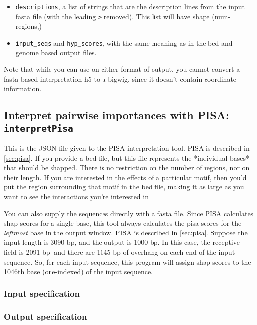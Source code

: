 \documentclass{article}
\begin{document}
\begin{itemize}
    \item \texttt{descriptions}, a list of strings that are the description
        lines from the input fasta file (with the leading \texttt{>} removed).
        This list will have shape (num-regions,)
    \item \texttt{input\_seqs} and \texttt{hyp\_scores}, with the same meaning
        as in the bed-and-genome based output files.
\end{itemize}

Note that while you can use  on either format of
 output, you cannot convert a fasta-based interpretation
h5 to a bigwig, since it doesn't contain coordinate information.


\newpage
\subsection{Interpret pairwise importances with PISA: \texttt{interpretPisa}}\label{prog:interpretPisa}

This is the JSON file given to the PISA interpretation tool. PISA is described
in \ref{sec:pisa}.
If you provide a bed file, but this file represents the *individual bases* that
should be shapped.
There is no restriction on the number of regions, nor on their length.
If you are interested in the effects of a particular motif, then you'd put the
region surrounding that motif in the bed file, making it as large as you want
to see the interactions you're interested in

You can also supply the sequences directly with a fasta file.
Since PISA calculates shap scores for a single base, this tool always calculates
the pisa scores for the \emph{leftmost} base in the output window.
PISA is described in \ref{sec:pisa}.
Suppose the input length is 3090 bp, and the output is 1000 bp.
In this case, the receptive field is 2091 bp, and there are 1045 bp of overhang
on each end of the input sequence.
So, for each input sequence, this program will assign shap scores to the 1046th
base (one-indexed) of the input sequence.

\subsubsection{Input specification}



\subsubsection{Output specification}
\end{document}
